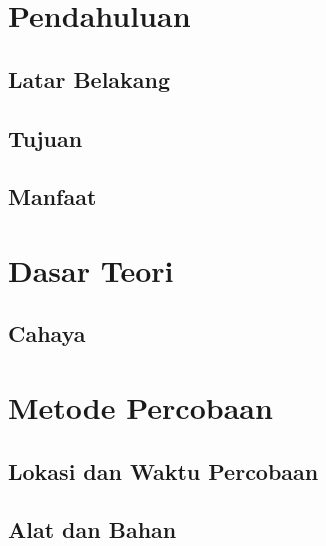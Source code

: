 \documentclass[a4paper, 12pt, oneside]{book}
\begin{document}



\newpage
\chapter{Pendahuluan}
\section{Latar Belakang}

\section{Tujuan}

\section{Manfaat}


\chapter{Dasar Teori}
\section{Cahaya}


\chapter{Metode Percobaan}
\section{Lokasi dan Waktu Percobaan}

\section{Alat dan Bahan}

% 
\end{document}
